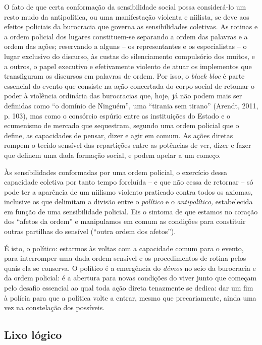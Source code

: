 O fato de que certa conformação da sensibilidade social possa
considerá-lo um resto mudo da antipolítica, ou uma manifestação violenta
e niilista, se deve aos efeitos policiais da burocracia que governa as
sensibilidades coletivas. As rotinas e a ordem policial dos lugares
constituem-se separando a ordem das palavras e a ordem das ações;
reservando a alguns -- os representantes e os especialistas -- o lugar
exclusivo do discurso, às custas do silenciamento compulsório dos
muitos, e a outros, o papel executivo e efetivamente violento de atuar
os implementos que transfiguram os discursos em palavras de ordem. Por
isso, o \emph{black bloc} é parte essencial do evento que consiste na
ação concertada do corpo social de retomar o poder à violência ordinária
das burocracias que, hoje, já não podem mais ser definidas como ``o
domínio de Ninguém'', uma ``tirania sem tirano'' (Arendt, 2011, p. 103),
mas como o consórcio espúrio entre as instituições do Estado e o
ecumenismo de mercado que sequestram, segundo uma ordem policial que o
define, as capacidades de pensar, dizer e agir em comum. As ações
diretas rompem o tecido sensível das repartições entre as potências de
ver, dizer e fazer que definem uma dada formação social, e podem apelar
a um começo.

Às sensibilidades conformadas por uma ordem policial, o exercício dessa
capacidade coletiva por tanto tempo forcluída -- e que não cessa de
retornar -- só pode ter a aparência de um niilismo violento praticado
contra todos os axiomas, inclusive os que delimitam a divisão entre o
\emph{político }e o\emph{ antipolítico,} estabelecida em função de uma
sensibilidade policial. Eis o sintoma de que estamos no coração dos
``afetos da ordem'' e manipulamos em comum as condições para constituir
outras partilhas do sensível (``outra ordem dos afetos'').

É isto, o político: estarmos às voltas com a capacidade comum para o
evento, para interromper uma dada ordem sensível e os procedimentos de
rotina pelos quais ela se conserva. O político é a emergência do
\emph{démos} no seio da burocracia e da ordem policial: é a abertura
para novas condições do viver junto que começam pelo desafio essencial
ao qual toda ação direta tenazmente se dedica: dar um fim à polícia para
que a política volte a entrar, mesmo que precariamente, ainda uma vez na
constelação dos possíveis.

\subsection{Lixo lógico}

